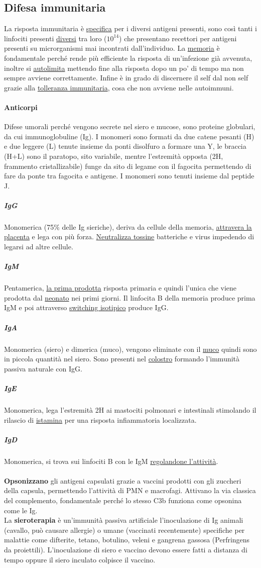 \documentclass[10pt]{article}
\begin{document}
\subsection*{Difesa immunitaria} 
La risposta immunitaria è \underline{specifica} per i diversi antigeni presenti, sono così tanti i linfociti presenti \underline{diversi} tra loro ($10^{14}$) che presentano recettori per antigeni presenti su microrganismi mai incontrati dall'individuo. La \underline{memoria} è fondamentale perché rende più efficiente la risposta di un'infezione già avvenuta, inoltre si \underline{autolimita} mettendo fine alla risposta dopo un po' di tempo ma non sempre avviene correttamente. Infine è in grado di discernere il self dal non self grazie alla \underline{tolleranza immunitaria}, cosa che non avviene nelle autoimmuni.
\paragraph*{Anticorpi}Difese umorali perché vengono secrete nel siero e mucose, sono proteine globulari, da cui immunoglobuline (Ig). I monomeri sono formati da due catene pesanti (H) e due leggere (L) tenute insieme da ponti disolfuro a formare una Y, le braccia (H+L) sono il paratopo, sito variabile, mentre l'estremità opposta (2H, frammento cristallizabile) funge da sito di legame con il fagocita permettendo di fare da ponte tra fagocita e antigene. I monomeri sono tenuti insieme dal peptide J.
\subparagraph*{IgG} Monomerica (75\% delle Ig sieriche), deriva da cellule della memoria, \underline{attravera la placenta} e lega con più forza. \underline{Neutralizza tossine} batteriche e virus impedendo di legarsi ad altre cellule.
\subparagraph*{IgM} Pentamerica, \underline{la prima prodotta} risposta primaria e quindi l'unica che viene prodotta dal \underline{neonato} nei primi giorni. Il linfocita B della memoria produce prima IgM e poi attraverso \underline{switching isotipico} produce IgG.
\subparagraph*{IgA} Monomerica (siero) e dimerica (muco), vengono eliminate con il \underline{muco} quindi sono in piccola quantità nel siero. Sono presenti nel \underline{colostro} formando l'immunità passiva naturale con IgG.
\subparagraph*{IgE} Monomerica, lega l'estremità 2H ai mastociti polmonari e intestinali stimolando il rilascio di \underline{istamina} per una risposta infiammatoria localizzata.
\subparagraph*{IgD} Monomerica, si trova sui linfociti B con le IgM \underline{regolandone l'attività}.
\\\\
\textbf{Opsonizzano} gli antigeni capsulati grazie a vaccini prodotti con gli zuccheri della capsula, permettendo l'attività di PMN e macrofagi. Attivano la via classica del complemento, fondamentale perché lo stesso C3b funziona come opsonina come le Ig.\\
La \textbf{sieroterapia} è un'immunità passiva artificiale l'inoculazione di Ig animali (cavallo, può causare allergie) o umane (vaccinati recentemente) specifiche per malattie come difterite, tetano, botulino, veleni e gangrena gassosa (Perfringens da proiettili). L'inoculazione di siero e vaccino devono essere fatti a distanza di tempo oppure il siero inculato colpisce il vaccino.
\end{document}
